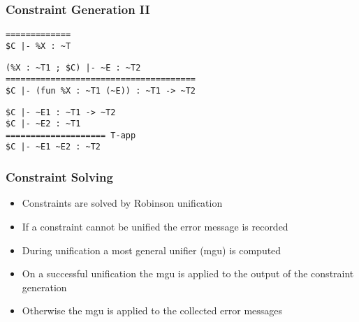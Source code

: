 \documentclass{beamer}
\begin{document}
\begin{frame}[fragile]
  \frametitle{Constraint Generation II}
\tiny
\begin{minipage}[b]{.2\linewidth}    
\begin{lstlisting}[language=sltc]
%X : ~T in $C
=============
$C |- %X : ~T
\end{lstlisting}
\end{minipage}
\begin{minipage}[b]{.45\linewidth}
\begin{lstlisting}[language=sltc]
(%X : ~T1 ; $C) |- ~E : ~T2
======================================
$C |- (fun %X : ~T1 (~E)) : ~T1 -> ~T2
\end{lstlisting}
\end{minipage}
\begin{minipage}[b]{.3\linewidth}
\begin{lstlisting}[language=sltc]
$C |- ~E1 : ~T1 -> ~T2
$C |- ~E2 : ~T1
==================== T-app
$C |- ~E1 ~E2 : ~T2
\end{lstlisting}
\end{minipage}

\end{frame}

\renewcommand*\selectConstraintSolving{orange}
\renewcommand*\selectConstraintSolving{}

\begin{frame}
  \frametitle{Constraint Solving}
  \begin{itemize}
  \item Constraints are solved by Robinson unification
  \item If a constraint cannot be unified the error message is recorded
  \item During unification a most general unifier (mgu) is computed
  \item On a successful unification the mgu is applied to the output
    of the constraint generation
  \item Otherwise the mgu is applied to the collected error messages
  \end{itemize}
\end{frame}
\end{document}
